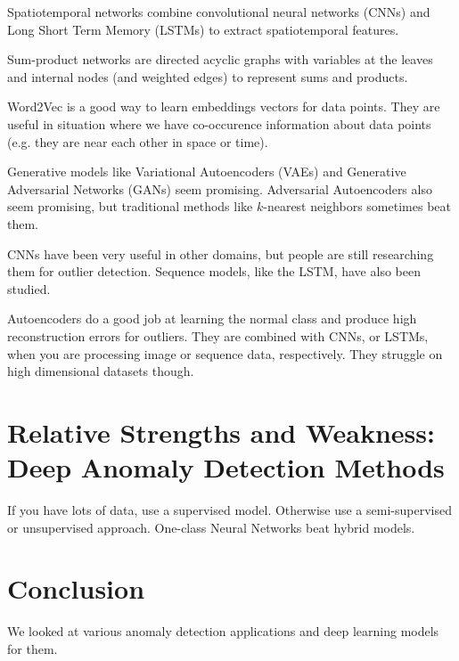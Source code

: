 \documentclass[a4paper]{article}
\begin{document}
Spatiotemporal networks combine convolutional neural networks (CNNs) and
Long Short Term Memory (LSTMs) to extract spatiotemporal features.

Sum-product networks are directed acyclic graphs with variables at the leaves
and internal nodes (and weighted edges) to represent sums and products.

Word2Vec is a good way to learn embeddings vectors for data points. They are
useful in situation where we have co-occurence information about data points
(e.g. they are near each other in space or time).

Generative models like Variational Autoencoders (VAEs) and Generative
Adversarial Networks (GANs) seem promising. Adversarial Autoencoders also seem
promising, but traditional methods like $k$-nearest neighbors sometimes beat
them.

CNNs have been very useful in other domains,
but people are still researching them for outlier detection. Sequence models,
like the LSTM, have also been studied.

Autoencoders do a good job at learning the normal class and produce high
reconstruction errors for outliers. They are combined with CNNs, or LSTMs,
when you are processing image or sequence data, respectively. They struggle on
high dimensional datasets though.

\section{Relative Strengths and Weakness: Deep Anomaly Detection Methods}
If you have lots of data, use a supervised model. Otherwise use a semi-supervised
or unsupervised approach. One-class Neural Networks beat hybrid models.

\section{Conclusion}
We looked at various anomaly detection applications and deep learning models
for them.
\end{document}

